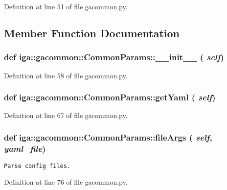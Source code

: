 Definition at line 51 of file gacommon.py.

\subsection{Member Function Documentation}
\subsubsection{\setlength{\rightskip}{0pt plus 5cm}def iga::gacommon::CommonParams::\_\-\_\-init\_\-\_\- ( {\em self})}\label{classiga_1_1gacommon_1_1CommonParams_d32e141ac8a18d646558811598b5a608}




Definition at line 58 of file gacommon.py.
\subsubsection{\setlength{\rightskip}{0pt plus 5cm}def iga::gacommon::CommonParams::getYaml ( {\em self})}\label{classiga_1_1gacommon_1_1CommonParams_10774435a719c938a8894397aec681d1}




Definition at line 67 of file gacommon.py.
\subsubsection{\setlength{\rightskip}{0pt plus 5cm}def iga::gacommon::CommonParams::fileArgs ( {\em self},  {\em yaml\_\-file})}\label{classiga_1_1gacommon_1_1CommonParams_189fc40e6d2489c9cb29e47f5f732de2}




\footnotesize\begin{verbatim}
Parse config files.
\end{verbatim}
\normalsize
 

Definition at line 76 of file gacommon.py.
